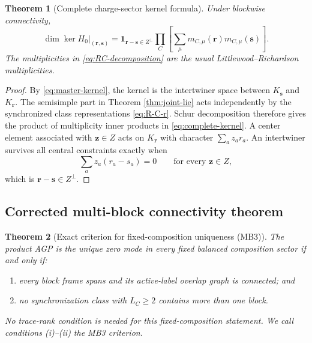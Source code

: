 \documentclass[11pt]{article}
\numberwithin{equation}{section}
\newtheorem{theorem}{Theorem}[section]
\begin{document}
\begin{theorem}[Complete charge-sector kernel formula]
\label{thm:complete-kernel}
Under blockwise connectivity,
\begin{equation}
 \boxed{
 \dim\ker H_0\big|_{(\mathbf r,\mathbf s)}
 =
 \mathbf 1_{\mathbf r-\mathbf s\in Z^\perp}
 \prod_C
 \left[
 \sum_\mu
 m_{C,\mu}(\mathbf r)m_{C,\mu}(\mathbf s)
 \right].}
 \label{eq:complete-kernel}
\end{equation}
The multiplicities in \eqref{eq:RC-decomposition} are the usual Littlewood--Richardson multiplicities.
\end{theorem}

\begin{proof}
By \eqref{eq:master-kernel}, the kernel is the intertwiner space between $K_{\mathbf s}$ and $K_{\mathbf r}$.  The semisimple part in Theorem \ref{thm:joint-lie} acts independently by the synchronized class representations \eqref{eq:R-C-r}.  Schur decomposition therefore gives the product of multiplicity inner products in \eqref{eq:complete-kernel}.  A center element associated with $\mathbf z\in Z$ acts on $K_{\mathbf r}$ with character $\sum_az_ar_a$.  An intertwiner survives all central constraints exactly when
\begin{equation}
 \sum_az_a(r_a-s_a)=0
 \qquad
 \text{for every }\mathbf z\in Z,
 \label{eq:center-character-match}
\end{equation}
which is $\mathbf r-\mathbf s\in Z^\perp$.
\end{proof}

\subsection{Corrected multi-block connectivity theorem}

\begin{theorem}[Exact criterion for fixed-composition uniqueness (MB3)]
\label{thm:MB3-criterion}
The product AGP is the unique zero mode in every fixed balanced composition sector if and only if:
\begin{enumerate}[label=(\roman*),leftmargin=2.6em]
\item every block frame spans and its active-label overlap graph is connected; and
\item no synchronization class with $L_C\ge2$ contains more than one block.
\end{enumerate}
No trace-rank condition is needed for this fixed-composition statement.  We call conditions (i)--(ii) the MB3 criterion.
\end{theorem}
\end{document}
